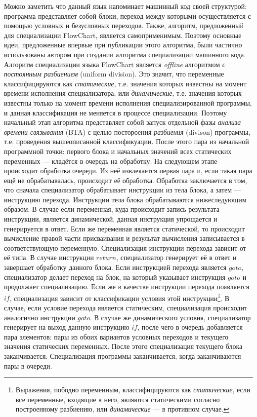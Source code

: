 Можно заметить что данный язык напоминает машинный код своей структурой: программа представляет собой блоки, переход между которыми
осуществляется с помощью условных и безусловных переходов.
Также, алгоритм, предложенный для специализации \textsf{FlowChart}, является самоприменимым.
Поэтому основные идеи, предложенные впервые при публикации этого алгоритма, были частично использованы автором при создании
алгоритма специализации машинного кода.
Алгоритм специализации языка \textsf{FlowChart} является \emph{offline} алгоритмом \emph{с постоянным разбиением} (uniform division).
Это значит, что переменные классифицируются как \emph{статические}, т.е. значения которых известны на момент времени исполнения
специализатора, или \emph{динамические}, т.е. значения которых известны только на момент времени исполнения специализированной программы,
и данная классификация не меняется в процессе специализации.
Поэтому начальный этап алгоритма представляет собой запуск отдельной фазы \emph{анализа времени связывания} (BTA) с целью постороения
\emph{разбиения} (divison) программы, т.е. проведения вышеописанной классификуации.
После этого пара из начальной программной точки: первого блока и начальных значений всех статических переменных ---
кладётся в очередь на обработку.
На следующем этапе происходит обработка очереди. Из неё извлекается первая пара и, если такая пара ещё не обрабатывалась, происходит её обработка. Обработка заключается в том, что сначала специализатор обрабатывает инструкции из тела блока, а затем --- инструкцию перехода. Инструкции тела блока обрабатываются нижеследующим образом. В случае если переменная, куда происходит запись результата инструкции, является динамической, данная инструкция упрощается и генерируется в ответ. Если же переменная является статической, то происходит вычисление правой части присваивания и результат вычисления записывается в соответствующую переменную. Специализация инструкции перехода зависит от её типа. В случае инструкции $return$, специализатор генерирует её в ответ и завершает обработку данного блока. Если инструкцией перехода является $goto$, специализатор делает переход на блок, на который указывает инструкция $goto$ и продолжает специализацию.
Если же в качестве инструкции перехода появляется $if$, специализация зависит от классификации условия этой
инструкции\footnote{Выражения, пободно переменным, классифицируются как \emph{статические}, если все переменные, входящие в него,
  являются статическими согласно построенному разбиению, или \emph{динамические} --- в противном случае.}.
В случае, если условие перехода является статическим, специализация происходит аналогично инструкции $goto$.
В случае же динамического условия, специализатор генерирует на выход данную инструкцию $if$,
после чего в очередь добавляется пара элементов: пары из обоих вариантов условных переходов и текущего значения статических переменных.
После этого специализация текущего блока заканчивается. Специализация программы заканчивается, когда заканчиваются пары в очереди. 

